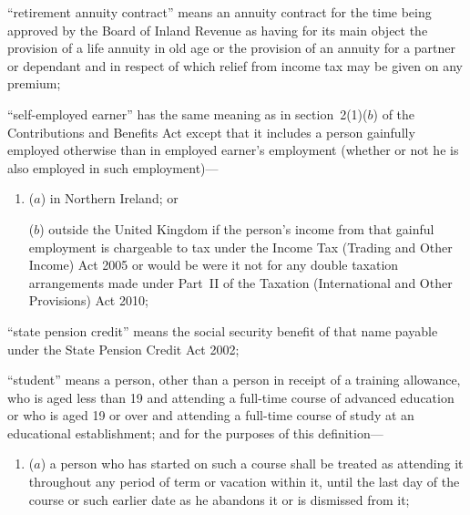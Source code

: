 \documentclass[12pt,a4paper]{article}
\begin{document}
\begin{enumerate}

“retirement annuity contract” means an annuity contract for the time being approved by the Board of Inland Revenue as having for its main object the provision of a life annuity in old age or the provision of an annuity for a partner or dependant and in respect of which relief from income tax may be given on any premium;


“self-employed earner” has the same meaning as in section~2(1)($b$)  of the Contributions and Benefits Act except that it includes a person gainfully employed otherwise than in employed earner’s employment (whether or not he is also employed in such employment)---
\begin{enumerate}\item[]
($a$) 
in Northern Ireland; or

($b$) 
outside the United Kingdom if the person’s income from that gainful employment is chargeable to tax under the Income Tax (Trading and Other Income) Act 2005 or would be were it not for any double taxation arrangements made under Part~II of the Taxation (International and Other Provisions) Act 2010;
\end{enumerate}

“state pension credit” means the social security benefit of that name payable under the State Pension Credit Act 2002;

“student” means a person, other than a person in receipt of a training allowance, who is aged less than 19 and attending a full-time course of advanced education or who is aged 19 or over and attending a full-time course of study at an educational establishment; and for the purposes of this definition—
\begin{enumerate}\item[]
($a$) 
a person who has started on such a course shall be treated as attending it throughout any period of term or vacation within it, until the last day of the course or such earlier date as he abandons it or is dismissed from it;


\end{enumerate}
\end{enumerate}
\end{document}
